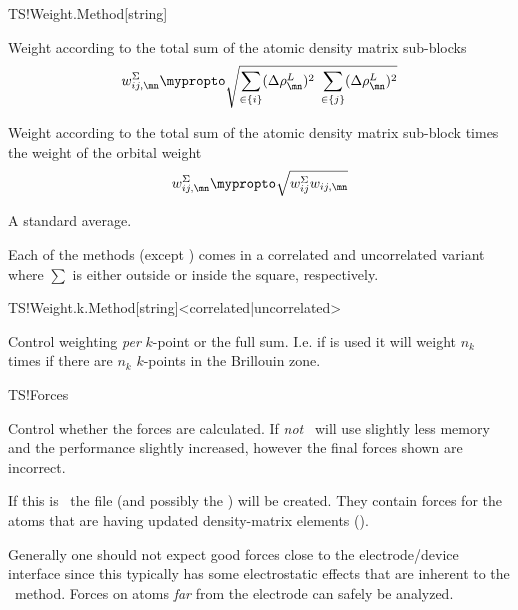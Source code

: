 \begin{fdfentry}{TS!Weight.Method}[string]
\begin{fdfoptions}
    
    Weight according to the total sum of the atomic density matrix
    sub-blocks
    \begin{equation}
      w_{ij,\mn}^{\Sigma} \mypropto
      \sqrt{
          \sum_{\in\{i\}}(\Delta\rho_{\mn}^L)^2
          \; %
          \sum_{\in\{j\}}(\Delta\rho_{\mn}^L)^2
      }
    \end{equation}

    
    Weight according to the total sum of the atomic density matrix
    sub-block times the weight of the orbital weight
    \begin{equation}
      w_{ij,\mn}^{\Sigma} \mypropto
      \sqrt{
          w_{ij}^{\Sigma} 
          w_{ij,\mn}
      }
    \end{equation}

    \option[mean]%
    
    A standard average.
    
  \end{fdfoptions}


  Each of the methods (except ) comes in a correlated and
  uncorrelated variant where $\sum$ is either outside or inside the
  square, respectively.

\end{fdfentry}

\begin{fdfentry}{TS!Weight.k.Method}[string]<correlated|uncorrelated>

  Control weighting \emph{per} $k$-point or the full sum. I.e. if
   is used it will weight $n_k$ times if there are
  $n_k$ $k$-points in the Brillouin zone.
  
\end{fdfentry}

\begin{fdflogicalT}{TS!Forces}
  
  Control whether the forces are calculated. If \emph{not} \tsiesta\
  will use slightly less memory and the performance slightly
  increased, however the final forces shown are incorrect.

  If this is \fdftrue\ the file  (and possibly the
  \sysfile{TSFAC}) will be created. They contain forces for the atoms
  that are having updated density-matrix elements
  (). 

  Generally one should not expect good forces close to the
  electrode/device interface since this typically has some
  electrostatic effects that are inherent to the \tsiesta\ method.
  Forces on atoms \emph{far} from the electrode can safely be
  analyzed.

\end{fdflogicalT}

